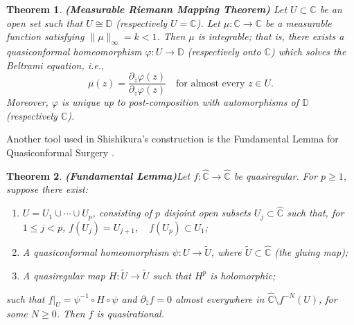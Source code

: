 \documentclass[12pt]{article}
\newtheorem{theorem}{Theorem}[section]
\begin{document}
\begin{theorem}\textbf{(Measurable Riemann Mapping Theorem)}
Let \( U \subset \mathbb{C} \) be an open set such that \( U \cong \mathbb{D} \) (respectively \( U = \mathbb{C} \)). Let \( \mu : \mathbb{C} \to \mathbb{C} \) be a measurable function satisfying $\|\mu\|_{\infty} = k < 1$. Then \( \mu \) is integrable; that is, there exists a quasiconformal homeomorphism \( \varphi : U \to \mathbb{D} \) (respectively onto \( \mathbb{C} \)) which solves the Beltrami equation, i.e.,
\[
\mu(z) = \frac{\partial_{\bar{z}} \varphi(z)}{\partial_z \varphi(z)}
\quad \text{for almost every } z \in U.
\]
Moreover, \( \varphi \) is unique up to post-composition with automorphisms of \( \mathbb{D} \) (respectively \( \mathbb{C} \)).

\end{theorem}
Another tool used in  Shishikura's construction is the Fundamental Lemma for Quasiconformal Surgery \cite{branner2014quasiconformal,smm}. 
\begin{theorem}\textbf{(Fundamental Lemma)}\label{fl}
    Let \( f : \widehat{\mathbb{C}} \to \widehat{\mathbb{C}} \) be quasiregular.  
For \( p \geq 1 \), suppose there exist:

\begin{enumerate}
    \item \( U = U_1 \cup \cdots \cup U_p \), consisting of \( p \) disjoint open subsets \( U_j \subset \hat{\mathbb{C}} \) such that, for \( 1 \leq j < p \),   $f(U_j) = U_{j+1}, \quad f(U_p) \subset U_1$;
    
    
    \item A quasiconformal homeomorphism \( \psi : U \to \tilde{U} \), where \( \tilde{U} \subset \hat{\mathbb{C}} \) (the gluing map);
    
    \item A quasiregular map \( H : \tilde{U} \to \tilde{U} \) such that \( H^p \) is holomorphic;
\end{enumerate}
such that \( f|_U = \psi^{-1} \circ H \circ \psi \) and \( \partial_{\bar{z}} f = 0 \) almost everywhere in \( \hat{\mathbb{C}} \setminus f^{-N}(U) \), for some \( N \geq 0 \). Then \( f \) is quasirational.
\end{theorem}
\end{document}
